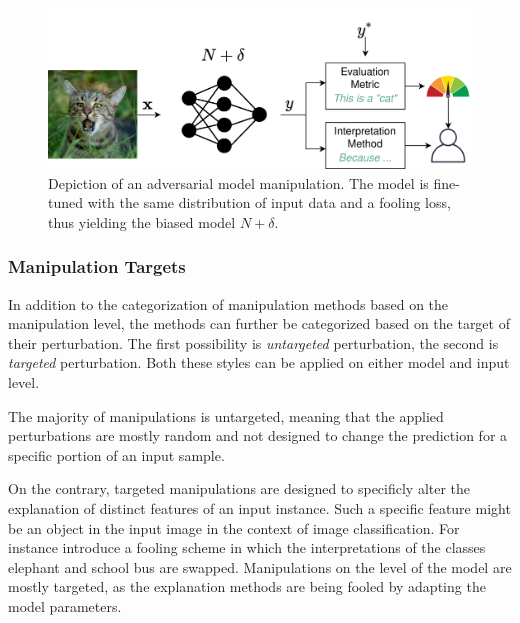 \begin{figure}[ht]
    \centering
    \includegraphics[width=\linewidth]{figures/model_manipulations.png}
    \caption{Depiction of an adversarial model manipulation. The model is fine-tuned with the same distribution of input data and a fooling loss, thus yielding the biased model $N+\delta$.}
    \label{fig:input_manipulation}
    \vspace{-0.3cm}
\end{figure}

\subsubsection{Manipulation Targets}
\label{subsubsec:manipulation_targets}

\par\smallskip
\noindent
In addition to the categorization of manipulation methods based on the manipulation level, the methods can further be categorized based on the target of their perturbation. The first possibility is \textit{untargeted} perturbation, the second is \textit{targeted} perturbation. Both these styles can be applied on either model and input level. 

The majority of manipulations is untargeted, meaning that the applied perturbations are mostly random and not designed to change the prediction for a specific portion of an input sample. 

On the contrary, targeted manipulations are designed to specificly alter the explanation of distinct features of an input instance. Such a specific feature might be an object in the input image in the context of image classification. 
For instance \cite{fooling_nn_interpreters} introduce a fooling scheme in which the interpretations of the classes elephant and school bus are swapped. 
Manipulations on the level of the model are mostly targeted, as the explanation methods are being fooled by adapting the model parameters. 

